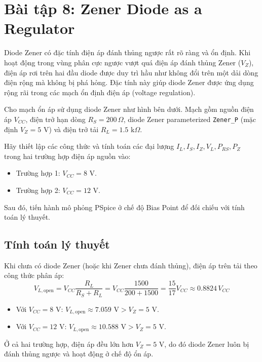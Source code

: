 \section{Bài tập 8: Zener Diode as a Regulator}

Diode Zener có đặc tính điện áp đánh thủng ngược rất rõ ràng và ổn định. Khi hoạt động trong vùng phân cực ngược vượt quá điện áp đánh thủng Zener ($V_Z$), điện áp rơi trên hai đầu diode được duy trì hầu như không đổi trên một dải dòng điện rộng mà không bị phá hỏng. Đặc tính này giúp diode Zener được ứng dụng rộng rãi trong các mạch ổn định điện áp (voltage regulation).

Cho mạch ổn áp sử dụng diode Zener như hình bên dưới. Mạch gồm nguồn điện áp $V_{CC}$, điện trở hạn dòng $R_S = 200\,\Omega$, diode Zener parameterized \texttt{Zener\_P} (mặc định $V_Z = 5\text{ V}$) và điện trở tải $R_L = 1.5\text{ k}\Omega$.

Hãy thiết lập các công thức và tính toán các đại lượng $I_L, I_S, I_Z, V_L, P_{RS}, P_Z$ trong hai trường hợp điện áp nguồn vào:
\begin{itemize}[leftmargin=1.5em]
  \item Trường hợp 1: $V_{CC} = 8\text{ V}$.
  \item Trường hợp 2: $V_{CC} = 12\text{ V}$.
\end{itemize}
Sau đó, tiến hành mô phỏng PSpice ở chế độ Bias Point để đối chiếu với tính toán lý thuyết.


\subsection{Tính toán lý thuyết}
Khi chưa có diode Zener (hoặc khi Zener chưa đánh thủng), điện áp trên tải theo công thức phân áp:
\begin{equation}
  V_{L,\text{open}} = V_{CC} \frac{R_L}{R_S + R_L} = V_{CC} \frac{1500}{200 + 1500} = \frac{15}{17} V_{CC} \approx 0.8824\,V_{CC}
\end{equation}
\begin{itemize}[leftmargin=1.5em]
  \item Với $V_{CC} = 8\text{ V}$: $V_{L,\text{open}} \approx 7.059\text{ V} > V_Z = 5\text{ V}$.
  \item Với $V_{CC} = 12\text{ V}$: $V_{L,\text{open}} \approx 10.588\text{ V} > V_Z = 5\text{ V}$.
\end{itemize}
Ở cả hai trường hợp, điện áp đều lớn hơn $V_Z = 5\text{ V}$, do đó diode Zener luôn bị đánh thủng ngược và hoạt động ở chế độ ổn áp.

